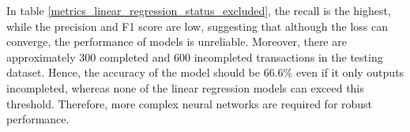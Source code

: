 \documentclass[12pt,twoside]{report}
\begin{document}
In table \ref{metrics_linear_regression_status_excluded}, the recall is the highest, while the precision and F1 score are low, suggesting that although the loss can converge, the performance of models is unreliable. Moreover, there are approximately 300 completed and 600 incompleted transactions in the testing dataset. Hence, the accuracy of the model should be 66.6\% even if it only outputs incompleted, whereas none of the linear regression models can exceed this threshold. Therefore, more complex neural networks are required for robust performance. 
\\

\begin{figure}[h]
	\centering
	\hfill
	\hfill
	\hfil

\end{figure}
\end{document}
